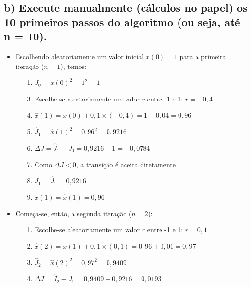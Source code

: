 \documentclass{report}
\begin{document}
\subsection*{b) Execute manualmente (cálculos no papel) os 10 primeiros passos do algoritmo (ou seja, até n = 10).}

\begin{itemize}

\item Escolhendo aleatoriamente um valor inicial $x(0) = 1$  para a primeira iteração ($n = 1$), temos:

\begin{itemize}

\item[1.] $J_{0} = x(0)^2 = 1^2 = 1$

\item[3.] Escolhe-se aleatoriamente um valor $r$ entre -1 e 1: $r = -0,4$

\item[4.] $\hat{x}(1) = x(0) + 0,1 \times (-0,4) = 1 - 0,04 = 0,96$

\item[5.] $\hat{J}_{1} = \hat{x}(1)^2 = 0,96^2 = 0,9216$

\item[6.] $\Delta J = \hat{J}_{1} - J_{0} = 0,9216 - 1 = -0,0784$

\item[7.] Como $\Delta J < 0$, a transição é aceita diretamente

\item[8.] $J_{1} = \hat{J}_{1} = 0,9216$

\item[9.] $x(1) = \hat{x}(1) = 0,96$

\end{itemize}

\item Começa-se, então, a segunda iteração ($n = 2$):

\begin{itemize}

\item[1.] Escolhe-se aleatoriamente um valor $r$ entre -1 e 1: $r = 0,1$

\item[2.] $\hat{x}(2) = x(1) + 0,1 \times (0,1) = 0,96 + 0,01 = 0,97$

\item[3.] $\hat{J}_{2} = \hat{x}(2)^2 = 0,97^2 = 0,9409$

\item[4.] $\Delta J = \hat{J}_{2} - J_{1} = 0,9409 - 0,9216 = 0,0193$


\end{itemize}
\end{itemize}
\end{document}
